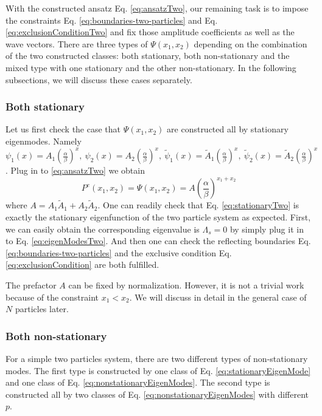 With the constructed ansatz Eq. \eqref{eq:ansatzTwo}, our remaining task is to impose the constraints Eq. \eqref{eq:boundaries-two-particles} and Eq. \eqref{eq:exclusionConditionTwo} and fix those amplitude coefficients as well as the wave vectors. There are three types of $\Psi(x_1,x_2)$ depending on the combination of the two constructed classes: both stationary, both non-stationary and the mixed type with one stationary and the other non-stationary. In the following subsections, we will discuss these cases separately.  

\subsubsection{Both stationary}
\label{ssub:Both stationary}

Let us first check the case that $\Psi(x_1, x_2)$ are constructed all by stationary eigenmodes. 
Namely $ \psi_1(x) = A_1\left(\frac{\alpha}{\beta}\right)^x, ~\psi_2(x) = A_2\left(\frac{\alpha}{\beta}\right)^x, ~\tilde{\psi}_1(x) = \tilde{A}_1\left(\frac{\alpha}{\beta}\right)^x, ~\tilde{\psi}_2(x) = \tilde{A}_2\left(\frac{\alpha}{\beta}\right)^x$. 
Plug in to \eqref{eq:ansatzTwo} we obtain
\begin{equation}
    \label{eq:stationaryTwo}
    P^e(x_1, x_2) = \Psi(x_1, x_2) = 
    A \left(\frac{\alpha}{\beta}\right)^{x_1+x_2}
\end{equation}
where $A=A_1\tilde{A}_1+A_2\tilde{A}_2$. One can readily check that Eq. \eqref{eq:stationaryTwo} is exactly the stationary eigenfunction of the two particle system as expected. First, we can easily obtain the corresponding eigenvalue is $\Lambda_s=0$ by simply plug it in to Eq. \eqref{eq:eigenModesTwo}.  And then one can check the reflecting boundaries Eq.  \eqref{eq:boundaries-two-particles} and the exclusive condition Eq.  \eqref{eq:exclusionCondition} are both fulfilled. 

The prefactor $A$ can be fixed by normalization. However, it is not a trivial work because of the constraint $x_1 < x_2$. We will discuss in detail in the general case of $N$ particles later. 


\subsubsection{Both non-stationary}
\label{ssub:Both non-stationary}

For a simple two particles system, there are two different types of non-stationary modes. The first type is constructed by one class of Eq.  \eqref{eq:stationaryEigenMode} and one class of Eq.  \eqref{eq:nonstationaryEigenModes}. The second type is constructed all by two classes of Eq. \eqref{eq:nonstationaryEigenModes} with different $p$.

